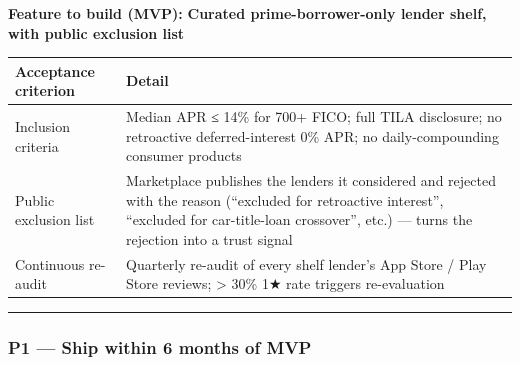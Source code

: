\documentclass[
  10pt,
]{article}
\begin{document}
\textbf{Feature to build (MVP):} \textbf{Curated prime-borrower-only lender shelf, with public
exclusion list}

\begin{longtable}[]{@{}ll@{}}
\toprule
\begin{minipage}[b]{0.47\columnwidth}\raggedright
Acceptance criterion\strut
\end{minipage} & \begin{minipage}[b]{0.47\columnwidth}\raggedright
Detail\strut
\end{minipage}\tabularnewline
\midrule
\endhead
\begin{minipage}[t]{0.47\columnwidth}\raggedright
Inclusion criteria\strut
\end{minipage} & \begin{minipage}[t]{0.47\columnwidth}\raggedright
Median APR ≤ 14\% for 700+ FICO; full TILA disclosure; no retroactive deferred-interest 0\% APR; no
daily-compounding consumer products\strut
\end{minipage}\tabularnewline
\begin{minipage}[t]{0.47\columnwidth}\raggedright
Public exclusion list\strut
\end{minipage} & \begin{minipage}[t]{0.47\columnwidth}\raggedright
Marketplace publishes the lenders it considered and rejected with the reason (``excluded for
retroactive interest'', ``excluded for car-title-loan crossover'', etc.) --- turns the rejection
into a trust signal\strut
\end{minipage}\tabularnewline
\begin{minipage}[t]{0.47\columnwidth}\raggedright
Continuous re-audit\strut
\end{minipage} & \begin{minipage}[t]{0.47\columnwidth}\raggedright
Quarterly re-audit of every shelf lender's App Store / Play Store reviews; \textgreater{} 30\% 1★
rate triggers re-evaluation\strut
\end{minipage}\tabularnewline
\bottomrule
\end{longtable}

\begin{center}\rule{0.5\linewidth}{0.5pt}\end{center}

\hypertarget{p1-ship-within-6-months-of-mvp}{%
\subsubsection{P1 --- Ship within 6 months of MVP}\label{p1-ship-within-6-months-of-mvp}}
\end{document}
